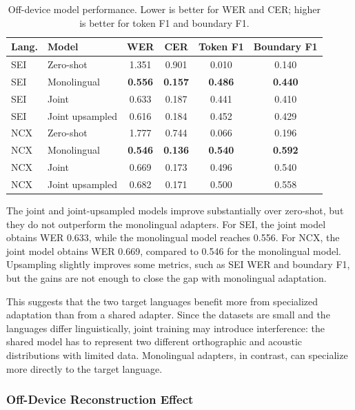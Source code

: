 \documentclass[11pt]{article}
\begin{document}
\begin{table}[h]
\centering
\small
\begin{tabular}{llcccc}
\hline
\textbf{Lang.} & \textbf{Model} & \textbf{WER} & \textbf{CER} & \textbf{Token F1} & \textbf{Boundary F1} \\
\hline
SEI & Zero-shot & 1.351 & 0.901 & 0.010 & 0.140 \\
SEI & Monolingual & \textbf{0.556} & \textbf{0.157} & \textbf{0.486} & \textbf{0.440} \\
SEI & Joint & 0.633 & 0.187 & 0.441 & 0.410 \\
SEI & Joint upsampled & 0.616 & 0.184 & 0.452 & 0.429 \\
\hline
NCX & Zero-shot & 1.777 & 0.744 & 0.066 & 0.196 \\
NCX & Monolingual & \textbf{0.546} & \textbf{0.136} & \textbf{0.540} & \textbf{0.592} \\
NCX & Joint & 0.669 & 0.173 & 0.496 & 0.540 \\
NCX & Joint upsampled & 0.682 & 0.171 & 0.500 & 0.558 \\
\hline
\end{tabular}
\caption{Off-device model performance. Lower is better for WER and CER; higher is better for token F1 and boundary F1.}
\label{tab:off-device-results}
\end{table}

The joint and joint-upsampled models improve substantially over zero-shot, but they do not outperform the monolingual adapters. For SEI, the joint model obtains WER 0.633, while the monolingual model reaches 0.556. For NCX, the joint model obtains WER 0.669, compared to 0.546 for the monolingual model. Upsampling slightly improves some metrics, such as SEI WER and boundary F1, but the gains are not enough to close the gap with monolingual adaptation.

This suggests that the two target languages benefit more from specialized adaptation than from a shared adapter. Since the datasets are small and the languages differ linguistically, joint training may introduce interference: the shared model has to represent two different orthographic and acoustic distributions with limited data. Monolingual adapters, in contrast, can specialize more directly to the target language.

\subsubsection{Off-Device Reconstruction Effect}
\end{document}
